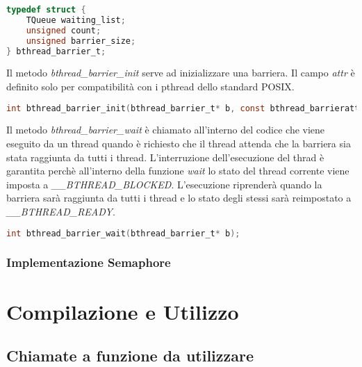 \documentclass{article}
\begin{document}
\begin{lstlisting}[language=C]
typedef struct {
    TQueue waiting_list;
    unsigned count;
    unsigned barrier_size;
} bthread_barrier_t;
\end{lstlisting}

\noindent Il metodo \textit{bthread\_barrier\_init} serve ad inizializzare una barriera. Il campo \textit{attr} è definito solo per compatibilità con i pthread dello standard POSIX.

\begin{lstlisting}[language=C]
int bthread_barrier_init(bthread_barrier_t* b, const bthread_barrierattr_t* attr, unsigned count);
\end{lstlisting}

\noindent Il metodo \textit{bthread\_barrier\_wait} è chiamato all'interno del codice che viene eseguito da un thread quando è richiesto che il thread attenda che la barriera sia stata raggiunta da tutti i thread. L'interruzione dell'esecuzione del thrad è garantita perchè all'interno della funzione \textit{wait} lo stato del thread corrente viene imposta a \textit{\_\_BTHREAD\_BLOCKED}. L'esecuzione riprenderà quando la barriera sarà raggiunta da tutti i thread e lo stato degli stessi sarà reimpostato a \textit{\_\_BTHREAD\_READY}.

\begin{lstlisting}[language=C]
int bthread_barrier_wait(bthread_barrier_t* b);
\end{lstlisting}


\subsubsection{Implementazione Semaphore}
\vspace{2mm}


\section{Compilazione e Utilizzo}
\vspace{5mm}

\subsection{Chiamate a funzione da utilizzare}
\vspace{2mm}
\end{document}
